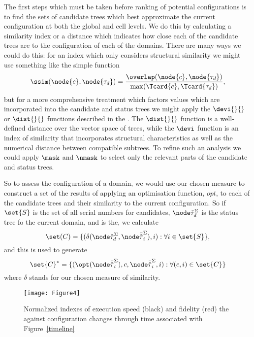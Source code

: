The first steps which must be taken before ranking of potential
configur\-ations is to find the sets of candidate trees which best
approximate the current con\-fig\-ur\-a\-tion at both the global and
cell levels. We do this by calculating a similarity index or a
distance which indicates how close each of the candidate trees are to
the configur\-ation of each of the domains. There are many ways we
could do this: for an index which only considers structural similarity
we might use something like the simple function
\begin{equation*}
  \ssim(\node{c},\node{\tau_d}) =
  \frac{\overlap(\node{c},\node{\tau_d})}{\max(\Tcard{c},\Tcard{\tau_d})}, 
\end{equation*}
but for a more comprehensive treatment which factors values which are
incorporated into the candidate and status trees we might apply the
$\devi{}{}$ or $\dist{}{}$ functions described in the \appendixname. The
$\dist{}{}$ function is a well-defined distance over the vector space of
trees, while the $\devi$ function is an index of similarity that
incorporates structural characteristics as well as the numerical
distance between compatible subtrees.  To refine such an analysis we could apply
$\mask$ and $\nmask$ to select only the relevant parts of the
candidate and status trees.

So to assess the con\-fig\-ur\-a\-tion of a domain, we would use our chosen
measure to construct a set of the results of applying an optimisation
function, $opt$, to each of the candidate trees and their similarity
to the current con\-fig\-ur\-a\-tion.  So if $\set{S}$ is the set of all
serial numbers for candidates, $\domt{d}$ is the status tree fo the
current domain, and  is the, we calculate
\begin{equation*}
  \set(C) = \{(\delta(\domt{d},\cst{i}),i): \forall i \in \set{S}\},
\end{equation*}
and this is used to generate
\begin{equation*}
  \set{C}^* = \{(\opt(\cst{i}),c,\cst{i},i): \forall(c,i) \in \set{C}\}
\end{equation*}
where $\delta$ stands for our chosen measure of similarity.

\begin{figure}\label{indices}
\begin{center}
  \texttt{[image: Figure4]}
  \caption{Normalized indexes of execution speed (black) and fidelity (red) the 
    against configuration changes through time associated with Figure~\ref{timeline}}
\end{center}
\end{figure}

